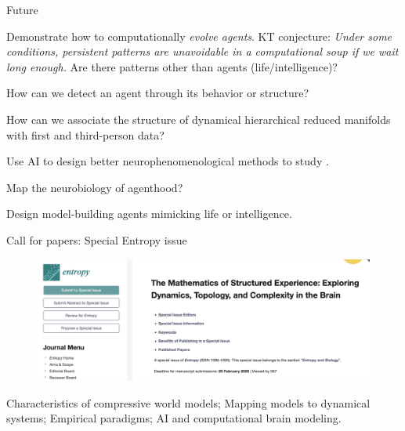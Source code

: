 \begin{frame}[label=ladila]{Future}
 

Demonstrate how to computationally \textit{evolve agents}. KT conjecture: \textit{\textit{Under some conditions, persistent patterns} are unavoidable  in a computational soup if we wait long enough.} Are there patterns other than agents  (life/intelligence)? \vfill

How can we detect an agent through its behavior or structure? \vfill


How can we associate the structure of dynamical hierarchical reduced manifolds\cite{ruffini_algorithmic_2024} with first and third-person data?\vfill

Use AI to design better neurophenomenological methods to study \SEP.   \vfill

Map the neurobiology of agenthood\cite{ruffini_algorithmic_2024}?\vfill

Design model-building agents mimicking life or intelligence. 
 
\end{frame}


\begin{frame}{Call for papers: Special Entropy issue}

\begin{figure}
        \centering
        \includegraphics[width=0.81\linewidth]{image8b.png}
        \end{figure}
     
        

 

\begin{tcolorbox}[colback=gray!10, colframe=gray!70, title={Topics}]
  Characteristics of compressive world models; Mapping models to dynamical systems;  
Empirical paradigms; 
AI and computational  brain modeling. 
\end{tcolorbox}
\end{frame}



